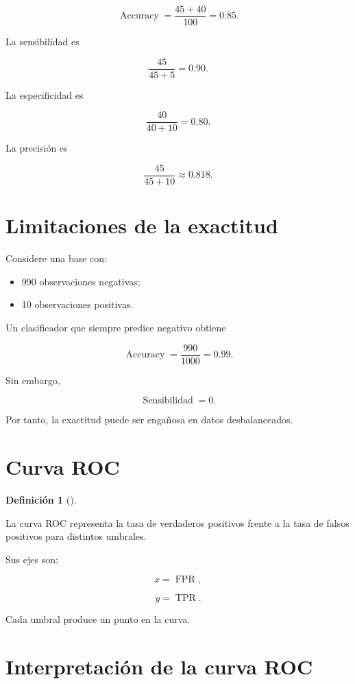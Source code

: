 \documentclass[
  spanish,
  11pt,
  letterpaper,
  DIV=11,
  numbers=noendperiod]{scrreprt}
\providecommand{\tightlist}{%
  \setlength{\itemsep}{0pt}\setlength{\parskip}{0pt}}
\theoremstyle{definition}
\newtheorem{definition}{Definición}[chapter]
\theoremstyle{plain}
\theoremstyle{definition}
\theoremstyle{remark}
\begin{document}
\[
\operatorname{Accuracy}
=
\frac{45+40}{100}
=
0.85.
\]

La sensibilidad es

\[
\frac{45}{45+5}
=
0.90.
\]

La especificidad es

\[
\frac{40}{40+10}
=
0.80.
\]

La precisión es

\[
\frac{45}{45+10}
\approx 0.818.
\]

\section{Limitaciones de la
exactitud}\label{limitaciones-de-la-exactitud}

Considere una base con:

\begin{itemize}
\tightlist
\item
  990 observaciones negativas;
\item
  10 observaciones positivas.
\end{itemize}

Un clasificador que siempre predice negativo obtiene

\[
\operatorname{Accuracy}
=
\frac{990}{1000}
=
0.99.
\]

Sin embargo,

\[
\operatorname{Sensibilidad}=0.
\]

Por tanto, la exactitud puede ser engañosa en datos desbalanceados.

\section{Curva ROC}\label{curva-roc}

\begin{definition}[]\protect\hypertarget{def-curva-roc}{}\label{def-curva-roc}

La curva ROC representa la tasa de verdaderos positivos frente a la tasa
de falsos positivos para distintos umbrales.

\end{definition}

Sus ejes son:

\[
x=\operatorname{FPR},
\]

\[
y=\operatorname{TPR}.
\]

Cada umbral produce un punto en la curva.

\section{Interpretación de la curva
ROC}\label{interpretaciuxf3n-de-la-curva-roc}
\end{document}
